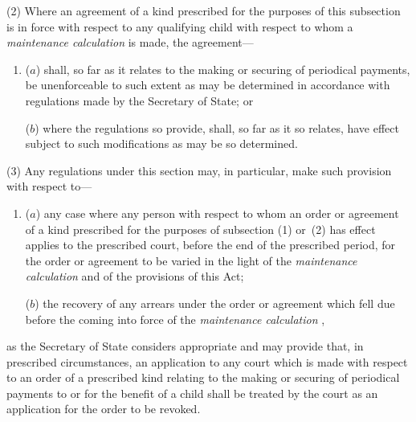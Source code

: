 \documentclass[12pt,a4paper]{article}
\begin{document}
(2) Where an agreement of a kind prescribed for the purposes of this subsection is in force with respect to any qualifying child with respect to whom a 
\emph{maintenance calculation}  %
is made, the agreement—
\begin{enumerate}\item[]
($a$) shall, so far as it relates to the making or securing of periodical payments, be unenforceable to such extent as may be determined in accordance with regulations made by the Secretary of State; or

($b$) where the regulations so provide, shall, so far as it so relates, have effect subject to such modifications as may be so determined.
\end{enumerate}

(3) Any regulations under this section may, in particular, make such provision with respect to—
\begin{enumerate}\item[]
($a$) any case where any person with respect to whom an order or agreement of a kind prescribed for the purposes of subsection (1)  or~(2)  has effect applies to the prescribed court, before the end of the prescribed period, for the order or agreement to be varied in the light of the 
\emph{maintenance calculation}  %
and of the provisions of this Act;

($b$) the recovery of any arrears under the order or agreement which fell due before the coming into force of the 
\emph{maintenance calculation}%
,
\end{enumerate}
as the Secretary of State considers appropriate and may provide that, in prescribed circumstances, an application to any court which is made with respect to an order of a prescribed kind relating to the making or securing of periodical payments to or for the benefit of a child shall be treated by the court as an application for the order to be revoked.
\end{document}
